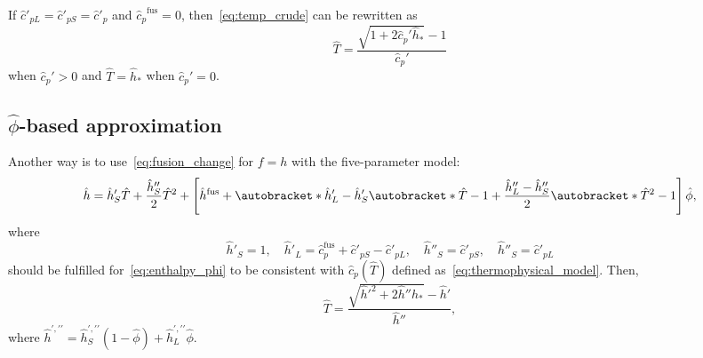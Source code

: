 \documentclass{article}
\DeclarePairedDelimiter\autobracket()       %
\newcommand{\br}[1]{\autobracket*{#1}}
\newcommand{\fusion}[1]{{#1}^\mathrm{fus}}
\begin{document}
If \(\hat{c}'_{pL} = \hat{c}'_{pS} = \hat{c}'_p\) and \(\fusion{\hat{c}_{p}} = 0\),
then~\eqref{eq:temp_crude} can be rewritten as
\begin{equation}\label{eq:temp_crude2}
	\hat{T} = \frac{\sqrt{1+2\hat{c}_p'\hat{h}_*}-1}{\hat{c}_p'}
\end{equation}
when \(\hat{c}_p'>0\) and \(\hat{T} = \hat{h}_*\) when \(\hat{c}_p'=0\).

\subsection{\(\hat\phi\)-based approximation}

Another way is to use~\eqref{eq:fusion_change} for \(f=h\) with the five-parameter model:
\begin{equation}\label{eq:enthalpy_phi}
	\hat{h} = \hat{h}'_S\hat{T} + \frac{\hat{h}''_S}2\hat{T}^2 + \left[
	    \fusion{\hat{h}} + \br{ \hat{h}'_L - \hat{h}'_S }\br{ \hat{T}-1 } +
	    \frac{\hat{h}''_L - \hat{h}''_S}2\br{ \hat{T}^2-1 }
	\right]\hat{\phi},
\end{equation}
where
\begin{equation}\label{eq:enthalpy_phi_params}
	\hat{h}'_S = 1, \quad \hat{h}'_L = \fusion{\hat{c}}_p + \hat{c}'_{pS} - \hat{c}'_{pL}, \quad
	\hat{h}''_S = \hat{c}'_{pS}, \quad \hat{h}''_S = \hat{c}'_{pL}
\end{equation}
should be fulfilled for~\eqref{eq:enthalpy_phi} to be consistent with \(\hat{c}_p(\hat{T})\)
defined as~\eqref{eq:thermophysical_model}. Then,
\begin{equation}\label{eq:temp_phi}
	\hat{T} = \frac{\sqrt{\hat{h}'^2 + 2\hat{h}''\hat{h}_*}-\hat{h}'}{\hat{h}''},
\end{equation}
where \(\hat{h}^{\prime,\prime\prime} = \hat{h}_S^{\prime,\prime\prime} (1-\hat\phi) + \hat{h}_L^{\prime,\prime\prime}\hat\phi\).
\end{document}
